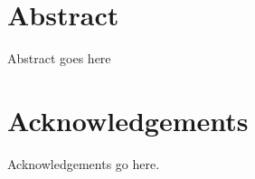 
\chapter*{\centering \Large \vspace{-20mm}\Huge Abstract}
\thispagestyle{headings}

Abstract goes here

\chapter*{\centering \Large \vspace{-20mm}\Huge Acknowledgements}
\thispagestyle{headings}

Acknowledgements go here.


\vspace{2cm}


\newpage
\thispagestyle{empty}

\tableofcontents

